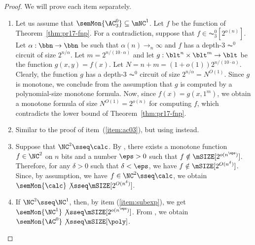 \documentclass[11pt]{article}
\begin{document}
\begin{proof}
    We will prove each item separately.
    \begin{enumerate}[label=\emph{Proof of (\arabic*)}., leftmargin=*]
        \item 
            Let us assume that
            $\semMon{\AC^0_3} \subseteq \mNC^1$.
            Let $f$ be the function of Theorem~\ref{thm:pr17-fnp}.
            For a contradiction,  suppose that 
            $f \in 
            \AC^0_3[2^{o(n)}]$.
            Let $\alpha : \bbn \to \bbn$ be such that
            $\alpha(n) \to_n \infty$
            and
            $f$ has a depth-3 $\AC^0$ circuit
            of size
            $2^{n/\alpha}$.
            Let $m = 2^{n/(10\cdot\alpha)}$
            and
            let $g : \blt^n \times \blt^m \to \blt$
            be the function
            $g(x,y) = f(x)$.
            Let $N = n+m = (1+o(1))2^{n/(10\cdot\alpha)}$.
            Clearly, the function $g$ has 
            a depth-3 $\AC^0$ circuit 
            of size $2^{n/\alpha} = N^{O(1)}$.
            Since $g$ is monotone,
            we conclude from the assumption 
            that $g$ is computed by a polynomial-size monotone formula.
            Now, since $f(x) = g(x,1^{m})$,
            we obtain a monotone formula of size
            $N^{O(1)} = 2^{o(n)}$ for computing $f$,
             which contradicts the lower bound of
             Theorem~\ref{thm:pr17-fnp}.
        \item 
            Similar to the proof of item~(\ref{item:ac03}),
            but using  instead.
        \item 
            Suppose that $\NC^2 \sseq \calc$.
            By , there exists a monotone function $f \in \NC^2$
            on $n$ bits
            and a number $\eps > 0$
            such that
            $f \notin \mSIZE[2^{o(n^{\eps})}]$.
            Therefore, for any $\delta > 0$ such that $\delta < \eps$,
            we have $f \notin \mSIZE[2^{O(n^\delta)}]$.
            Since, by assumption, we have $f \in \NC^2 \sseq \calc$,
            we obtain
            $\semMon{\calc} \not\sseq \mSIZE[2^{O(n^\delta)}]$.
        \item 
            If $\NC^2 \sseq \NC^1$, then,
            by 
            item (\ref{item:subexp}),
            we get
            $\semMon{\NC^1} \not\sseq \mSIZE[2^{o(n^\eps)}]$.
            From ,
            we obtain
            $\semMon{\AC^0} 
            \not\sseq \mSIZE[\poly]$.
            \qedhere
    \end{enumerate}
\end{proof}
\end{document}
